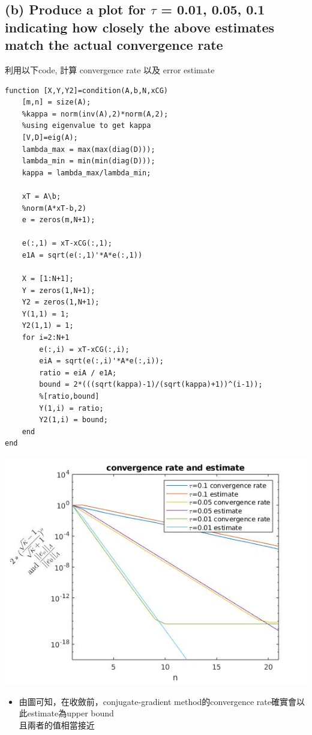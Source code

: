 \documentclass[12pt]{article}
\begin{document}
\subsection{(b) Produce a plot for $\tau$ = 0.01, 0.05, 0.1
indicating how closely the above estimates match the actual convergence rate}
利用以下code, 計算 convergence rate 以及 error estimate
\begin{lstlisting}
function [X,Y,Y2]=condition(A,b,N,xCG)
    [m,n] = size(A);
    %kappa = norm(inv(A),2)*norm(A,2);
    %using eigenvalue to get kappa
    [V,D]=eig(A);
    lambda_max = max(max(diag(D)));
    lambda_min = min(min(diag(D)));
    kappa = lambda_max/lambda_min;

    xT = A\b;
    %norm(A*xT-b,2)
    e = zeros(m,N+1);

    e(:,1) = xT-xCG(:,1);
    e1A = sqrt(e(:,1)'*A*e(:,1))
    
    X = [1:N+1];
    Y = zeros(1,N+1);
    Y2 = zeros(1,N+1);
    Y(1,1) = 1;
    Y2(1,1) = 1;
    for i=2:N+1
        e(:,i) = xT-xCG(:,i);
        eiA = sqrt(e(:,i)'*A*e(:,i));
        ratio = eiA / e1A;
        bound = 2*(((sqrt(kappa)-1)/(sqrt(kappa)+1))^(i-1));
        %[ratio,bound]
        Y(1,i) = ratio;
        Y2(1,i) = bound;
    end
end
\end{lstlisting}
\includegraphics[scale=1]{2.jpg}
\begin{itemize}
    \item 由圖可知，在收斂前，conjugate-gradient method的convergence rate確實會以此estimate為upper bound\\
          且兩者的值相當接近
\end{itemize}
\end{document}
